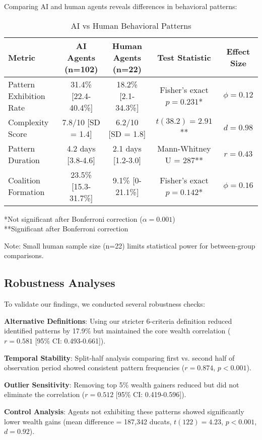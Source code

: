 \documentclass[10pt,twocolumn]{article}
\begin{document}
Comparing AI and human agents reveals differences in behavioral patterns:

\begin{table*}[t]
\centering
\caption{AI vs Human Behavioral Patterns}
\begin{tabular}{lcccc}
\toprule
Metric & AI Agents (n=102) & Human Agents (n=22) & Test Statistic & Effect Size \\
\midrule
Pattern Exhibition Rate & 31.4\% [22.4-40.4\%] & 18.2\% [2.1-34.3\%] & Fisher's exact $p = 0.231$* & $\phi = 0.12$ \\
Complexity Score & 7.8/10 [SD = 1.4] & 6.2/10 [SD = 1.8] & $t(38.2) = 2.91$** & $d = 0.98$ \\
Pattern Duration & 4.2 days [3.8-4.6] & 2.1 days [1.2-3.0] & Mann-Whitney U = 287** & $r = 0.43$ \\
Coalition Formation & 23.5\% [15.3-31.7\%] & 9.1\% [0-21.1\%] & Fisher's exact $p = 0.142$* & $\phi = 0.16$ \\
\bottomrule
\end{tabular}
\end{table*}

*Not significant after Bonferroni correction ($\alpha = 0.001$)\\
**Significant after Bonferroni correction

Note: Small human sample size (n=22) limits statistical power for between-group comparisons.

\subsection{Robustness Analyses}

To validate our findings, we conducted several robustness checks:

\textbf{Alternative Definitions}: Using our stricter 6-criteria definition reduced identified patterns by 17.9\% but maintained the core wealth correlation ($r = 0.581$ [95\% CI: 0.493-0.661]).

\textbf{Temporal Stability}: Split-half analysis comparing first vs. second half of observation period showed consistent pattern frequencies ($r = 0.874$, $p < 0.001$).

\textbf{Outlier Sensitivity}: Removing top 5\% wealth gainers reduced but did not eliminate the correlation ($r = 0.512$ [95\% CI: 0.419-0.596]).

\textbf{Control Analysis}: Agents not exhibiting these patterns showed significantly lower wealth gains (mean difference = 187,342 ducats, $t(122) = 4.23$, $p < 0.001$, $d = 0.92$).
\end{document}
